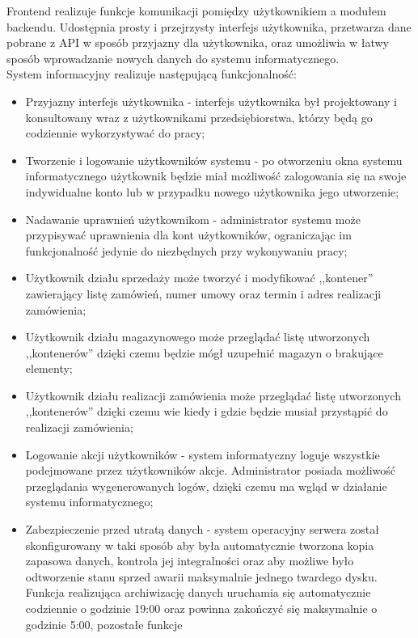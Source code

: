 \documentclass[12pt,a4paper]{article}
\begin{document}
		\indent Frontend realizuje funkcje komunikacji pomiędzy użytkownikiem a modułem backendu. Udostępnia prosty i przejrzysty interfejs użytkownika, przetwarza
			dane pobrane z API w sposób przyjazny dla użytkownika, oraz umożliwia w łatwy sposób wprowadzanie nowych danych do systemu informatycznego.\\			  
		\indent System informacyjny realizuje następującą funkcjonalność:
			\begin{itemize}
				\item Przyjazny interfejs użytkownika - interfejs użytkownika był projektowany i konsultowany wraz z użytkownikami przedsiębiorstwa, którzy będą go codziennie
					wykorzystywać do pracy;
				\item Tworzenie i logowanie użytkowników systemu - po otworzeniu okna systemu informatycznego użytkownik będzie miał możliwość zalogowania się na swoje indywidualne konto
					lub w przypadku nowego użytkownika jego utworzenie;
				\item Nadawanie uprawnień użytkownikom - administrator systemu może przypisywać uprawnienia dla kont użytkowników, ograniczając im funkcjonalność jedynie do niezbędnych
					przy wykonywaniu pracy; 
				\item Użytkownik działu sprzedaży może tworzyć i modyfikować ,,kontener'' zawierający listę zamówień, numer umowy oraz termin i adres realizacji zamówienia;
				\item Użytkownik działu magazynowego może przeglądać listę utworzonych ,,kontenerów'' dzięki czemu będzie mógł uzupełnić magazyn o brakujące elementy;
				\item Użytkownik działu realizacji zamówienia może przeglądać listę utworzonych ,,kontenerów'' dzięki czemu wie kiedy i gdzie będzie musiał przystąpić do realizacji zamówienia;
				\item Logowanie akcji użytkowników - system informatyczny loguje wszystkie podejmowane przez użytkowników akcje. Administrator posiada możliwość przeglądania
					wygenerowanych logów, dzięki czemu ma wgląd w działanie systemu informatycznego;  
				\item Zabezpieczenie przed utratą danych - system operacyjny serwera został skonfigurowany w taki sposób aby była automatycznie tworzona kopia zapasowa danych,
					kontrola jej integralności oraz aby możliwe było odtworzenie stanu sprzed awarii maksymalnie jednego twardego dysku.
					Funkcja realizująca archiwizację danych uruchamia się automatycznie codziennie o godzinie 19:00 oraz powinna zakończyć się maksymalnie o godzinie 5:00, pozostałe funkcje

\end{itemize}
\end{document}
